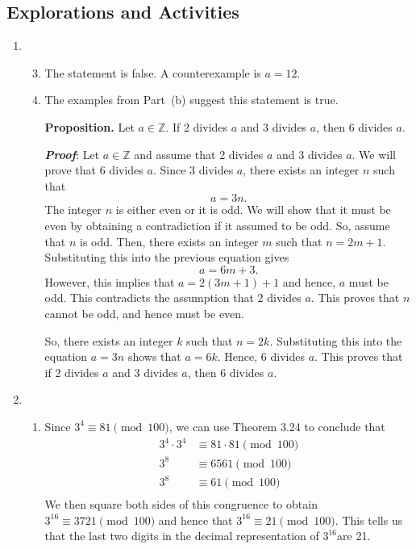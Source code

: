 \subsection*{Explorations and Activities}
\setcounter{oldenumi}{\theenumi}
\begin{enumerate} \setcounter{enumi}{\theoldenumi}
\item \begin{enumerate} \setcounter{enumii}{2}
\item The statement is false.  A counterexample is $a = 12$.
\item The examples from Part~(b) suggest this statement is true.

\noindent
\textbf{Proposition.}
Let  $a \in \mathbb{Z}$.  If  2  divides  $a$  and  3  divides  $a$, then  6  divides  $a$.

\noindent
\textbf{\emph{Proof}}:  Let  $a \in \mathbb{Z}$ and assume that  2  divides  $a$  and  3  divides  $a$.  We will prove that  6 divides  $a$.  Since  3  divides  $a$, there exists an integer  $n$  such that
\[
a = 3n.
\]
The integer  $n$  is either even or it is odd.  We will show that it must be even by obtaining a contradiction if it assumed to be odd.  So, assume that  $n$  is odd. Then, there exists an integer $m$ such that  $n = 2m + 1$.  Substituting this into the previous equation gives
\[
a = 6m + 3.
\]
However, this implies that $a = 2 \left( 3m + 1 \right) + 1$ and hence, $a$ must be odd.  This contradicts the assumption that 2 divides $a$.  This proves that $n$ cannot be odd, and hence must be even.

So, there exists an integer $k$ such that $n = 2k$.  Substituting this into the equation $a = 3n$ shows that $a = 6k$.  Hence, 6 divides $a$.  This proves that if 2 divides $a$ and 3 divides $a$, then 6 divides $a$. \qedsymbol
\end{enumerate}


\item
\begin{enumerate}
\item Since  $3^4  \equiv 81 \pmod{100}$, we can use Theorem 3.24 to conclude that
\[
\begin{aligned}
  3^4  \cdot 3^4  &\equiv 81 \cdot 81 \pmod{100} \\ 
  3^8  &\equiv 6561 \pmod{100} \\ 
  3^8  &\equiv 61 \pmod{100} \\ 
\end{aligned}
\]
We then square both sides of this congruence to obtain  
$3^{16}  \equiv 3721 \pmod{100}$ and hence that  $3^{16}  \equiv 21 \pmod{100}$.  This tells us that the last two digits in the decimal representation of  $3^{16} $are  21.


\end{enumerate}
\end{enumerate}
